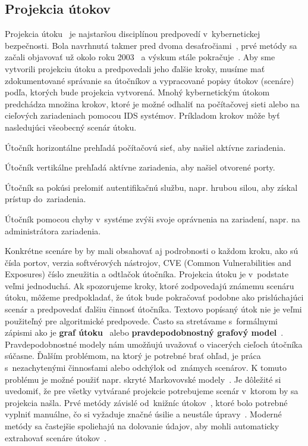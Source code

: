 \documentclass[thesismargins, thesislinespacing, openright, upjsfrontpage]{rnthesis}
\begin{document}
\subsection{Projekcia útokov}

Projekcia útoku~\cite{Yang2014} je najstaršou disciplínou predpovedí v~kybernetickej bezpečnosti. Bola navrhnutá takmer pred dvoma desaťročiami~\cite{geib2001plan}, prvé metódy sa začali objavovať už okolo roku 2003~\cite{hughes2003attack,qin2004attack} a výskum stále pokračuje~\cite{ahmed2017attack,zhang2019intrusion}. Aby sme vytvorili projekciu útoku a predpovedali jeho ďalšie kroky, musíme mať zdokumentované správanie sa útočníkov a vypracované popisy útokov (scenáre) podľa, ktorých bude projekcia vytvorená. Mnohý kybernetickým útokom predchádza množina krokov, ktoré je možné odhaliť na počítačovej sieti alebo na cieľových zariadeniach pomocou IDS systémov. Príkladom krokov môže byť nasledujúci všeobecný scenár útoku.

\begin{compactenum}
    \item Útočník horizontálne prehľadá počítačovú sieť, aby našiel aktívne zariadenia.
    \item Útočník vertikálne prehľadá aktívne zariadenia, aby našiel otvorené porty.
    \item Útočník sa pokúsi prelomiť autentifikačnú službu, napr. hrubou silou, aby získal prístup do~zariadenia.
    \item Útočník pomocou chyby v~systéme zvýši svoje oprávnenia na zariadení, napr. na administrátora zariadenia.
\end{compactenum}

Konkrétne scenáre by by mali obsahovať aj podrobnosti o každom kroku, ako sú čísla portov, verzia softvérových nástrojov, CVE (Common Vulnerabilities and Exposures) číslo zneužitia a odtlačok útočníka. Projekcia útoku je v~podstate veľmi jednoduchá. Ak spozorujeme kroky, ktoré zodpovedajú známemu scenáru útoku, môžeme predpokladať, že útok bude pokračovať podobne ako prislúchajúci scenár a predpovedať ďalšiu činnosť útočníka. Textovo popísaný útok nie je veľmi použiteľný pre algoritmické predpovede. Často sa stretávame s~formálnymi zápismi ako je \textbf{graf útoku}~\cite{hughes2003attack} alebo \textbf{pravdepodobnostný grafový model}~\cite{qin2004attack}. Pravdepodobnostné modely nám umožňujú uvažovať o viacerých cieľoch útočníka súčasne. Ďalším problémom, na ktorý je potrebné brať ohľad, je práca s~nezachytenými činnosťami alebo odchýlok od~známych scenárov. K tomuto problému je možné použiť napr. skryté Markovovské modely~\cite{farhadi2011alert}. Je dôležité si uvedomiť, že pre všetky vytvárané projekcie potrebujeme scenár v~ktorom by sa projekcia našla. Prvé metódy závislé od~knižníc útokov~\cite{qin2004attack}, ktoré bolo potrebné vyplniť manuálne, čo si vyžaduje značné úsilie a neustále úpravy~\cite{Yang2014}. Moderné metódy sa častejšie spoliehajú na dolovanie údajov, aby mohli automaticky extrahovať scenáre útokov~\cite{li2007data,farhadi2011alert,kim2014study}.
\end{document}
